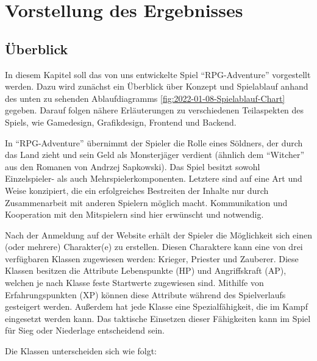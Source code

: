 

\section{Vorstellung des Ergebnisses}

\subsection{Überblick}
In diesem Kapitel soll das von uns entwickelte Spiel \enquote{RPG-Adventure} vorgestellt werden. Dazu wird zunächst ein Überblick über Konzept und Spielablauf anhand des unten zu sehenden Ablaufdiagramms \ref{fig:2022-01-08-Spielablauf-Chart} gegeben. Darauf folgen nähere Erläuterungen zu verschiedenen Teilaspekten des Spiels, wie Gamedesign, Grafikdesign, Frontend und Backend. 

In \enquote{RPG-Adventure} übernimmt der Spieler die Rolle eines Söldners, der durch das Land zieht und sein Geld als Monsterjäger verdient (ähnlich dem \enquote{Witcher} aus den Romanen von Andrzej Sapkowski). Das Spiel besitzt sowohl Einzelspieler- als auch Mehrspielerkomponenten. Letztere sind auf eine Art und Weise konzipiert, die ein erfolgreiches Bestreiten der Inhalte nur durch Zusammenarbeit mit anderen Spielern möglich macht. Kommunikation und Kooperation mit den Mitspielern sind hier erwünscht und notwendig. 

Nach der Anmeldung auf der Website erhält der Spieler die Möglichkeit sich einen (oder mehrere) Charakter(e) zu erstellen. Diesen Charaktere kann eine von drei verfügbaren Klassen zugewiesen werden: Krieger, Priester und Zauberer. Diese Klassen besitzen die Attribute Lebenspunkte (HP) und Angriffskraft (AP), welchen je nach Klasse feste Startwerte zugewiesen sind. Mithilfe von Erfahrungspunkten (XP) können diese Attribute während des Spielverlaufs gesteigert werden. Außerdem hat jede Klasse eine Spezialfähigkeit, die im Kampf eingesetzt werden kann. Das taktische Einsetzen dieser Fähigkeiten kann im Spiel für Sieg oder Niederlage entscheidend sein.

Die Klassen unterscheiden sich wie folgt:

